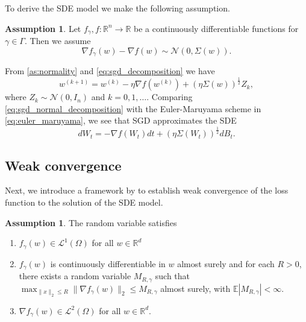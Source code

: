 \documentclass[12pt]{article}
\theoremstyle{definition}
\newtheorem{assumption}[theorem]{Assumption}
\numberwithin{equation}{section}
\newcommand{\R}{\mathbb{R}}
\newcommand{\CN}{\mathcal{N}}
\newcommand{\norm}[1]{\lVert{#1}\rVert_2}
\begin{document}
To derive the SDE model we make the following assumption.
\begin{assumption}
  \label{as:normality}
  Let $f_{\gamma}, f : \R^n \rightarrow \R$ be a continuously differentiable functions for $\gamma \in \Gamma$. Then we assume 
  \begin{equation}
    \nabla f_{\gamma}(w) - \nabla f(w) \sim \CN(0, \Sigma(w)).
  \end{equation}
\end{assumption}
From \autoref{as:normality} and \autoref{eq:sgd_decomposition} we have
\begin{equation}
  \label{eq:sgd_normal_decomposition}
  w^{(k+1)} = w^{(k)} - \eta \nabla f(w^{(k)}) + (\eta \Sigma(w))^{\frac{1}{2}} Z_k,
\end{equation}
where $Z_k \sim \CN(0,I_n)$ and $k=0,1,\dots$. Comparing \autoref{eq:sgd_normal_decomposition} with the Euler-Maruyama scheme in \autoref{eq:euler_maruyama}, we see that SGD approximates the SDE
\begin{equation}
  dW_t = -\nabla f(W_t)dt + (\eta \Sigma(W_t))^{\frac{1}{2}}dB_t.
\end{equation}
\subsection{Weak convergence}
Next, we introduce a framework by \autocite{liStochasticModifiedEquations2019} to establish weak convergence of the loss function to the solution of the SDE model.
\begin{assumption}
  The random variable satisfies 
  \begin{enumerate}
    \item $f_{\gamma}(w) \in \mathcal{L}^1(\Omega)$ for all $w \in \mathbb{R}^d$
    \item $f_{\gamma}(w)$ is continuously differentiable in $w$ almost surely and for each $R > 0$, there exists a random variable $M_{R,\gamma}$ such that $\max_{\norm{x} \leq R} \norm{ \nabla f_{\gamma}(w) } \leq M_{R,\gamma}$ almost surely, with $\mathbb{E} |M_{R,\gamma}| < \infty$.
    \item $\nabla f_{\gamma}(w) \in \mathcal{L}^2(\Omega)$ for all $w \in \mathbb{R}^d$.
  \end{enumerate}
\end{assumption}
\end{document}
